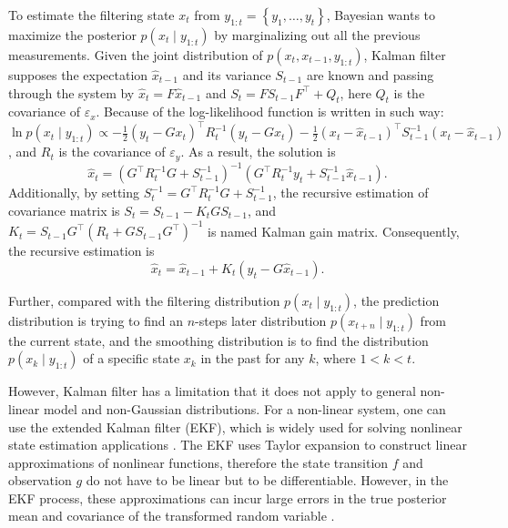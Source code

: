 To estimate the filtering state $x_t$ from $y_{1:t}=\left\lbrace y_1,\ldots,y_t\right\rbrace$, Bayesian wants to maximize the posterior $p(x_t\mid y_{1:t})$ by marginalizing out all the previous measurements. Given the joint distribution of $p(x_t,x_{t-1},y_{1:t})$, Kalman filter supposes the expectation $\hat{x}_{t-1}$ and its variance $S_{t-1}$ are known and passing through the system by $\hat{x}_t=F\hat{x}_{t-1}$ and $S_t=FS_{t-1}F^\top + Q_t$, here $Q_t$ is the covariance of $\varepsilon_x$. Because of the log-likelihood function is written in such way: 
$\ln p(x_t\mid y_{1:t}) \propto -\frac{1}{2}(y_t-Gx_t)^\top R_t^{-1}(y_t-Gx_t)-\frac{1}{2}(x_t-\hat{x}_{t-1})^\top S_{t-1}^{-1}(x_t-\hat{x}_{t-1})$, and $R_t$ is the covariance of $\varepsilon_y$. As a result, the solution is 
\begin{equation*}
\hat{x}_t = \left(G^\top R_t^{-1}G+S_{t-1}^{-1}\right)^{-1}\left( G^\top R_t^{-1}y_t+S_{t-1}^{-1}\hat{x}_{t-1} \right).
\end{equation*}
Additionally, by setting $S_t^{-1} = G^\top R_t^{-1}G+S_{t-1}^{-1}$, the recursive estimation of covariance matrix is $S_t = S_{t-1} - K_t GS_{t-1}$, 
and $K_t = S_{t-1} G^\top (R_t +GS_{t-1}G^\top)^{-1}$ is named Kalman gain matrix. Consequently, the recursive estimation is 
\begin{equation}\label{KalmanEstimation}
\hat{x}_t = \hat{x}_{t-1}+K_t(y_t-G\hat{x}_{t-1}).
\end{equation}

Further, compared with the filtering distribution $p(x_t\mid y_{1:t})$, the prediction distribution is trying to find an $n$-steps later distribution $p(x_{t+n}\mid y_{1:t})$ from the current state, and the smoothing distribution is to find the distribution $p(x_k\mid y_{1:t})$ of a specific state $x_k$ in the past for any $k$, where $1<k<t$. 

However, Kalman filter has a limitation that it does not apply to general non-linear model and non-Gaussian distributions. For a non-linear system, one can use the extended Kalman filter (EKF), which is widely used for solving nonlinear state estimation applications \citep{gelb1974applied, bar1993estimation}. The EKF uses Taylor expansion to construct linear approximations of nonlinear functions, therefore the state transition $f$ and observation $g$ do not have to be linear but to be differentiable. However, in the EKF process, these approximations can incur large errors in the true posterior mean and covariance of the transformed random variable \citep{wan2000unscented}. 

